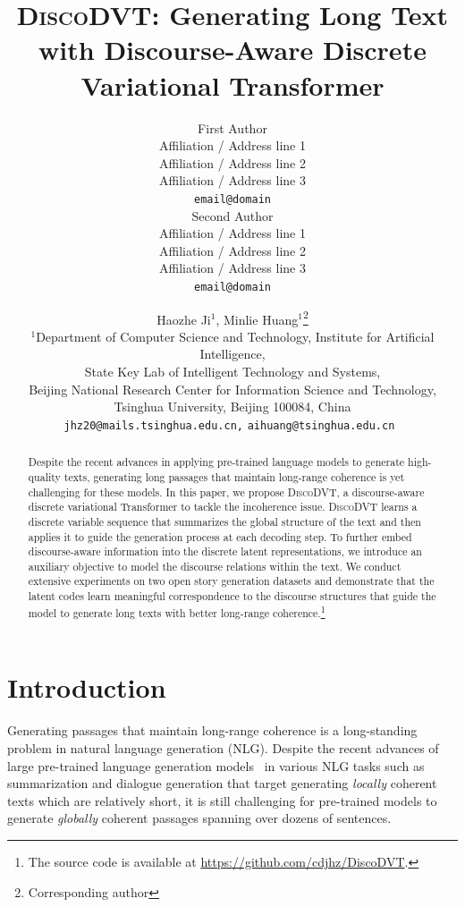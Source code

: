 \documentclass[11pt]{article}
\title{\textsc{DiscoDVT}: Generating Long Text with Discourse-Aware Discrete Variational Transformer}
\author{First Author \\
  Affiliation / Address line 1 \\
  Affiliation / Address line 2 \\
  Affiliation / Address line 3 \\
  \texttt{email@domain} \\\And
  Second Author \\
  Affiliation / Address line 1 \\
  Affiliation / Address line 2 \\
  Affiliation / Address line 3 \\
  \texttt{email@domain} \\}
\author{Haozhe Ji$^1$, Minlie Huang$^1$\thanks{\quad Corresponding author}  \\
$^1$Department of Computer Science and Technology,
Institute for Artificial Intelligence, \\
State Key Lab of Intelligent Technology and Systems, \\ 
Beijing National Research Center for Information Science and Technology, \\ 
Tsinghua University, Beijing 100084, China \\
  {\tt\small jhz20@mails.tsinghua.edu.cn,}
  {\tt\small aihuang@tsinghua.edu.cn } \\}
\begin{document}
\maketitle
\begin{abstract}
Despite the recent advances in applying pre-trained language models to generate high-quality texts, generating long passages that maintain long-range coherence is yet challenging for these models. In this paper, we propose \textsc{DiscoDVT}, a discourse-aware discrete variational Transformer to tackle the incoherence issue. \textsc{DiscoDVT} learns a discrete variable sequence that summarizes the global structure of the text and then applies it to guide the generation process at each decoding step. To further embed discourse-aware information into the discrete latent representations, we introduce an auxiliary objective to model the discourse relations within the text. We conduct extensive experiments on two open story generation datasets and demonstrate that the latent codes learn meaningful correspondence to the discourse structures that guide the model to generate long texts with better long-range coherence.\footnote{The source code is available at \url{https://github.com/cdjhz/DiscoDVT}.}
\end{abstract}

\section{Introduction}

Generating passages that maintain long-range coherence is a long-standing problem in natural language generation (NLG). 
Despite the recent advances of large pre-trained language generation models~\citep{radford2019language,bart} in various NLG tasks such as summarization and dialogue generation that target generating \textit{locally} coherent texts which are relatively short, it is still challenging for pre-trained models to generate \textit{globally} coherent passages spanning over dozens of sentences.
\end{document}
